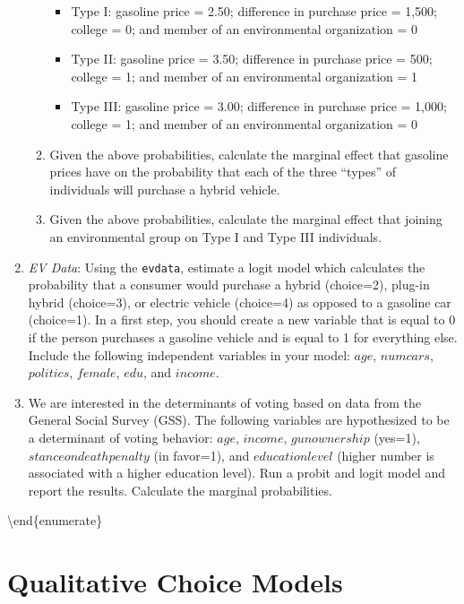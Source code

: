 \documentclass[
]{article}
\providecommand{\tightlist}{%
  \setlength{\itemsep}{0pt}\setlength{\parskip}{0pt}}
\begin{document}
\begin{enumerate}
\begin{enumerate}
    \begin{itemize}
    \tightlist
    \item
      Type I: gasoline price = 2.50; difference in purchase price = 1,500; college = 0; and member of an environmental organization = 0
    \item
      Type II: gasoline price = 3.50; difference in purchase price = 500; college = 1; and member of an environmental organization = 1
    \item
      Type III: gasoline price = 3.00; difference in purchase price = 1,000; college = 1; and member of an environmental organization = 0
    \end{itemize}
  \item
    Given the above probabilities, calculate the marginal effect that gasoline prices have on the probability that each of the three ``types'' of individuals will purchase a hybrid vehicle.
  \item
    Given the above probabilities, calculate the marginal effect that joining an environmental group on Type I and Type III individuals.
  \end{enumerate}
\item
  \emph{EV Data}: Using the \texttt{evdata}, estimate a logit model which calculates the probability that a consumer would purchase a hybrid (choice=2), plug-in hybrid (choice=3), or electric vehicle (choice=4) as opposed to a gasoline car (choice=1). In a first step, you should create a new variable that is equal to 0 if the person purchases a gasoline vehicle and is equal to 1 for everything else. Include the following independent variables in your model: \(age\), \(numcars\), \(politics\), \(female\), \(edu\), and \(income\).
\item
  We are interested in the determinants of voting based on data from the General Social Survey (GSS). The following variables are hypothesized to be a determinant of voting behavior: \(age\), \(income\), \(gun ownership\) (yes=1), \(stance on death penalty\) (in favor=1), and \(education level\) (higher number is associated with a higher education level). Run a probit and logit model and report the results. Calculate the marginal probabilities.
\end{enumerate}

\textbackslash end\{enumerate\}

\hypertarget{qualitative-choice-models}{%
\section{Qualitative Choice Models}\label{qualitative-choice-models}}
\end{document}

